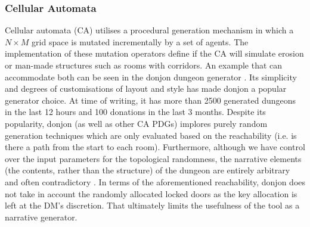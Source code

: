 \documentclass{UoYCSproject}
\begin{document}
\subsubsection{Cellular Automata}
Cellular automata (CA) utilises a procedural generation mechanism in which a $N \times M$ grid space is mutated incrementally by a set of agents. The implementation of these mutation operators define if the CA will simulate erosion \parencite{donjonCA} or man-made structures such as rooms with corridors. An example that can accommodate both can be seen in the donjon dungeon generator \parencite{donjonPDG}. Its simplicity and degrees of customisations of layout and style has made donjon a popular generator choice. At time of writing, it has more than 2500 generated dungeons in the last 12 hours and 100 donations in the last 3 months. Despite its popularity, donjon (as well as other CA PDGs) implores purely random generation techniques which are only evaluated based on the reachability (i.e. is there a path from the start to each room). Furthermore, although we have control over the input parameters for the topological randomness, the narrative elements (the contents, rather than the structure) of the dungeon are entirely arbitrary and often contradictory \parencite{Thrall,Brown}. In terms of the aforementioned reachability, donjon does not take in account the randomly allocated locked doors as the key allocation is left at the DM's discretion. That ultimately limits the usefulness of the tool as a narrative generator. %
\end{document}
